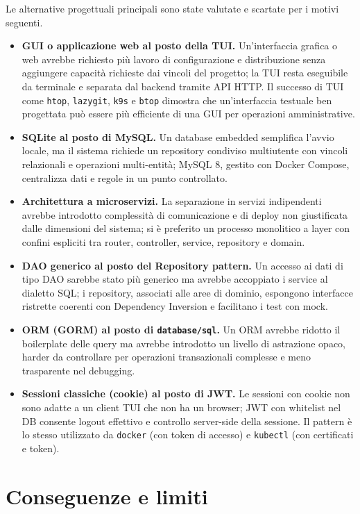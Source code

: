 \documentclass[a4paper,12pt]{article}
\begin{document}
Le alternative progettuali principali sono state valutate e scartate per i motivi seguenti.
\begin{itemize}
\item \textbf{GUI o applicazione web al posto della TUI.} Un'interfaccia grafica o web avrebbe richiesto più lavoro di configurazione e distribuzione senza aggiungere capacità richieste dai vincoli del progetto; la TUI resta eseguibile da terminale e separata dal backend tramite API HTTP. Il successo di TUI come \texttt{htop}, \texttt{lazygit}, \texttt{k9s} e \texttt{btop} dimostra che un'interfaccia testuale ben progettata può essere più efficiente di una GUI per operazioni amministrative.
\item \textbf{SQLite al posto di MySQL.} Un database embedded semplifica l'avvio locale, ma il sistema richiede un repository condiviso multiutente con vincoli relazionali e operazioni multi-entità; MySQL 8, gestito con Docker Compose, centralizza dati e regole in un punto controllato.
\item \textbf{Architettura a microservizi.} La separazione in servizi indipendenti avrebbe introdotto complessità di comunicazione e di deploy non giustificata dalle dimensioni del sistema; si è preferito un processo monolitico a layer con confini espliciti tra router, controller, service, repository e domain.
\item \textbf{DAO generico al posto del Repository pattern.} Un accesso ai dati di tipo DAO sarebbe stato più generico ma avrebbe accoppiato i service al dialetto SQL; i repository, associati alle aree di dominio, espongono interfacce ristrette coerenti con Dependency Inversion e facilitano i test con mock.
\item \textbf{ORM (GORM) al posto di \texttt{database/sql}.} Un ORM avrebbe ridotto il boilerplate delle query ma avrebbe introdotto un livello di astrazione opaco, harder da controllare per operazioni transazionali complesse e meno trasparente nel debugging.
\item \textbf{Sessioni classiche (cookie) al posto di JWT.} Le sessioni con cookie non sono adatte a un client TUI che non ha un browser; JWT con whitelist nel DB consente logout effettivo e controllo server-side della sessione. Il pattern è lo stesso utilizzato da \texttt{docker} (con token di accesso) e \texttt{kubectl} (con certificati e token).
\end{itemize}

\section{Conseguenze e limiti}
\end{document}
